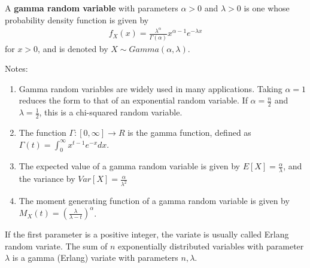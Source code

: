 \documentclass{article}
\begin{document}
A \textbf{gamma random variable} with parameters $\alpha>0$ and $\lambda>0$ is one whose probability density function is given by
\begin{align*}
f_X(x) = \frac{ \lambda^\alpha}{\Gamma(\alpha)} x^{\alpha - 1} e^{-\lambda x}  
\end{align*}
for $x>0$, and is denoted by $X\sim Gamma(\alpha, \lambda)$.

Notes:\\
\begin{enumerate}
\item Gamma random variables are widely used in many applications. Taking $\alpha = 1$ reduces the form to that of an exponential random variable. If $\alpha = \frac{n}{2}$ and $\lambda = \frac{1}{2}$, this is a chi-squared random variable.
\item The function $\Gamma: [0,\infty] \to R$ is the gamma function, defined as $\Gamma(t) = \int_{0}^{\infty}{x^{t-1} e^{-x} dx}$. 
\item The expected value of a gamma random variable is given by $E[X]=\frac{\alpha}{\lambda}$, and the variance by $Var[X] = \frac{\alpha}{\lambda^2}$
\item The moment generating function of a gamma random variable is given by $M_X(t) = (\frac{\lambda}{\lambda - t})^\alpha$.
\end{enumerate}

If the first parameter is a positive integer, the variate is usually called Erlang random variate. The sum of $n$ exponentially distributed variables with parameter $\lambda$ is a gamma (Erlang) variate with parameters $n, \lambda$.
\end{document}
